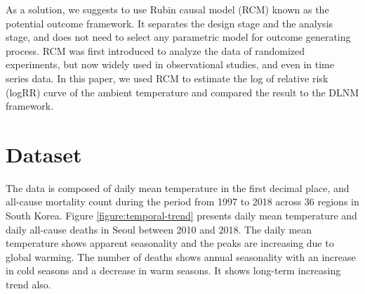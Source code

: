\documentclass[12pt]{article}
\begin{document}
As a solution, we suggests to use Rubin causal model (RCM)\cite{holland1986}
known as the potential outcome framework.
It separates the design stage and the analysis stage,
and does not need to select any parametric model for outcome generating process.
RCM was first introduced 
to analyze the data of randomized experiments\cite{rubin1974},
but now widely used in observational studies\cite{wu2020sciadv},
and even in time series data\cite{angrist2018}.
In this paper, 
we used RCM to estimate the log of relative risk (logRR) curve of the ambient temperature 
and compared the result to the DLNM framework.

\section{Dataset}
\label{section:data}

The data is composed of daily mean temperature in the first decimal place, and
all-cause mortality count during the period from 1997 to 2018 across 36 regions in South Korea.
Figure \ref{figure:temporal-trend}
presents daily mean temperature and daily all-cause deaths in Seoul between 2010 and 2018.
The daily mean temperature shows apparent seasonality and 
the peaks are increasing due to global warming.
The number of deaths shows annual seasonality 
with an increase in cold seasons and a decrease in warm seasons.
It shows long-term increasing trend also.
\end{document}
